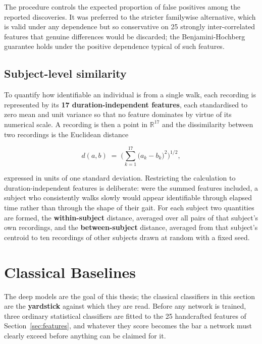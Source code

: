 \noindent The procedure controls the expected proportion of false positives
among the reported discoveries. It was preferred to the stricter familywise
alternative, which is valid under any dependence but so conservative on 25
strongly inter-correlated features that genuine differences would be
discarded; the Benjamini-Hochberg guarantee holds under the positive
dependence typical of such features.

\subsection{Subject-level similarity}

To quantify how identifiable an individual is from a single walk, each recording
is represented by its \textbf{17 duration-independent features}, each
standardised to zero mean and unit variance so that no feature dominates by
virtue of its numerical scale. A recording is then a point in $\mathbb{R}^{17}$
and the dissimilarity between two recordings is the Euclidean distance

\begin{equation}
  d(a, b) \;=\; \Bigg( \sum_{k=1}^{17} \big(a_k - b_k\big)^2 \Bigg)^{1/2},
  \label{eq:dist}
\end{equation}

\noindent expressed in units of one standard deviation. Restricting the
calculation to duration-independent features is deliberate: were the summed
features included, a subject who consistently walks slowly would appear
identifiable through elapsed time rather than through the shape of their gait.
For each subject two quantities are formed, the \textbf{within-subject}
distance, averaged over all pairs of that subject's own recordings, and the
\textbf{between-subject} distance, averaged from that subject's centroid to ten
recordings of other subjects drawn at random with a fixed seed.

\section{Classical Baselines}
\label{sec:baselines}

The deep models are the goal of this thesis; the classical classifiers in this
section are the \textbf{yardstick} against which they are read. Before any
network is trained, three ordinary statistical classifiers are fitted to the
25 handcrafted features of Section~\ref{sec:features}, and whatever they score
becomes the bar a network must clearly exceed before anything can be claimed
for it.

